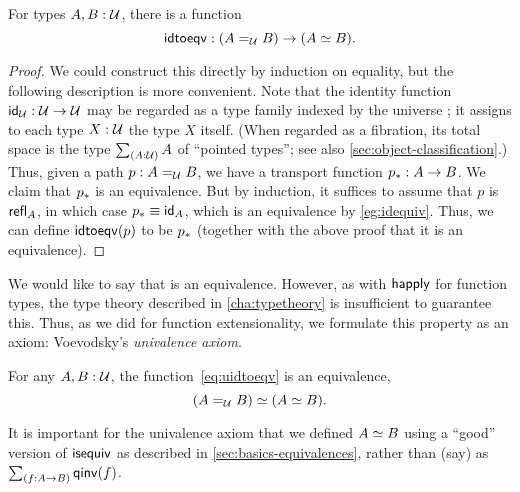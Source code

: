 \begin{lem}
  For types $A,B:\type$, there is a function
  \begin{equation}\label{eq:uidtoeqv}
    \idtoeqv : (\id[\type]AB) \to (\eqv A B).
  \end{equation}
\end{lem}
\begin{proof}
  We could construct this directly by induction on equality, but the following description is more convenient.
  Note that the identity function $\idfunc[\type]:\type\to\type$ may be regarded as a type family indexed by the universe \type; it assigns to each type $X:\type$ the type $X$ itself.
  (When regarded as a fibration, its total space is the type $\sm{A:\type}A$ of ``pointed types''; see also \autoref{sec:object-classification}.)
  Thus, given a path $p:A =_\type B$, we have a transport function $\transf{p}:A \to B$.
  We claim that $\transf{p}$ is an equivalence.
  But by induction, it suffices to assume that $p$ is $\refl A$, in which case $\transf{p} \jdeq \idfunc[A]$, which is an equivalence by \autoref{eg:idequiv}.
  Thus, we can define $\idtoeqv(p)$ to be $\transf{p}$ (together with the above proof that it is an equivalence).
\end{proof}

We would like to say that \idtoeqv is an equivalence.
However, as with $\happly$ for function types, the type theory described in \autoref{cha:typetheory} is insufficient to guarantee this.
Thus, as we did for function extensionality, we formulate this property as an axiom: Voevodsky's \emph{univalence axiom}.

\begin{axiom}[Univalence]\label{axiom:univalence}
  For any $A,B:\type$, the function~\eqref{eq:uidtoeqv} is an equivalence,
  \[
\eqv{(\id[\type]{A}{B})}{(\eqv A B)}.
\]
\end{axiom}

\begin{rmk}
  It is important for the univalence axiom that we defined $\eqv AB$ using a ``good'' version of $\isequiv$ as described in \autoref{sec:basics-equivalences}, rather than (say) as $\sm{f:A\to B} \qinv(f)$.
\end{rmk}

